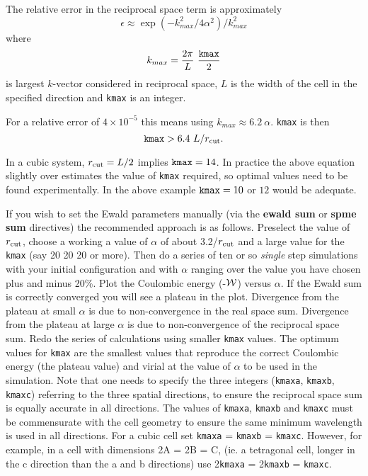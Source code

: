 The relative error in the reciprocal space term is approximately
\begin{equation}
\epsilon \approx \exp(- k_{max}^{2}/4\alpha^{2})/k_{max}^{2}
\end{equation}
where
\begin{equation}
k_{max} = \frac{2\pi}{L}~\frac{\tt kmax}{2}
\end{equation}
is largest $k$-vector considered in reciprocal space, $L$ is the
width of the cell in the specified direction and {\tt kmax} is an integer.

For a relative error of $4 \times 10^{-5}$ this means using
$k_{max} \approx 6.2~\alpha$.  {\tt kmax} is then
\begin{equation}
{\tt kmax} > 6.4~L/r_{\rm cut}.
\end {equation}

In a cubic system, $r_{\rm cut}=L/2$ implies ${\tt kmax}=14$.
In practice the above equation slightly over estimates the value
of {\tt kmax} required, so optimal values need to be found
experimentally.  In the above example ${\tt kmax}=10$ or $12$
would be adequate.

If you wish to set the Ewald parameters manually (via the
{\bf ewald sum} or {\bf spme sum} directives) the recommended
approach is as follows.  Preselect the value of $r_{\rm cut}$,
choose a working a value of $\alpha$ of about 3.2/$r_{\rm cut}$
and a large value for the {\tt kmax} (say 20 20 20 or more).
Then do a series of ten or so {\em single} step simulations with
your initial configuration and with $\alpha$ ranging over the
value you have chosen plus and minus 20\%.  Plot the Coulombic
energy (-$\cal W$) versus $\alpha$.  If the Ewald sum is correctly
converged you will see a plateau in the plot.  Divergence from the
plateau at small $\alpha$ is due to non-convergence in the real
space sum.  Divergence from the plateau at large $\alpha$ is due to
non-convergence of the reciprocal space sum.  Redo the series of
calculations using smaller {\tt kmax} values.  The optimum values
for {\tt kmax} are the smallest values that reproduce the correct
Coulombic energy (the plateau value) and virial at the value of
$\alpha$ to be used in the simulation.  Note that one needs to
specify the three integers ({\tt kmaxa}, {\tt kmaxb}, {\tt kmaxc})
referring to the three spatial directions, to ensure the reciprocal
space sum is equally accurate in all directions.  The values of
{\tt kmaxa}, {\tt kmaxb} and {\tt kmaxc} must be commensurate with
the cell geometry to ensure the same minimum wavelength is used in
all directions.  For a cubic cell set {\tt kmaxa} = {\tt kmaxb} = {\tt kmaxc}.
However, for example, in a cell with dimensions 2A = 2B = C,
(ie. a tetragonal cell, longer in the c direction than the a and b directions)
use 2{\tt kmaxa} = 2{\tt kmaxb} = {\tt kmaxc}.

